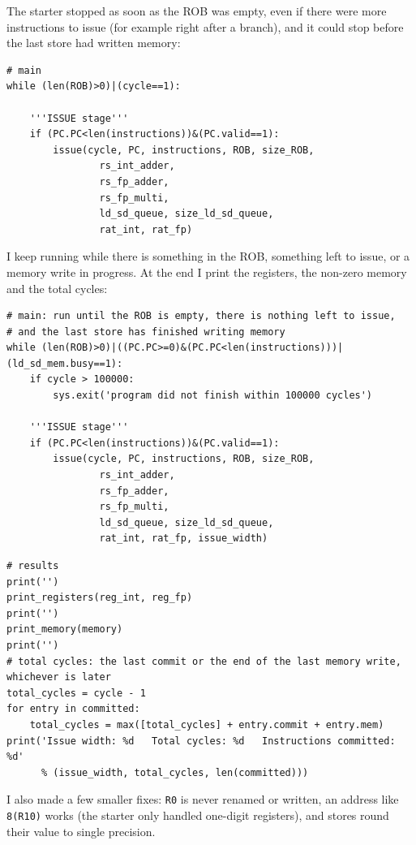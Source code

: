 \documentclass[11pt]{article}
\renewcommand{\_}{\origunderscore\allowbreak}
\begin{document}
The starter stopped as soon as the ROB was empty, even if there were more instructions to issue
(for example right after a branch), and it could stop before the last store had written memory:

\begin{lstlisting}
# main
while (len(ROB)>0)|(cycle==1):

    '''ISSUE stage'''
    if (PC.PC<len(instructions))&(PC.valid==1):
        issue(cycle, PC, instructions, ROB, size_ROB, 
                rs_int_adder, 
                rs_fp_adder, 
                rs_fp_multi, 
                ld_sd_queue, size_ld_sd_queue, 
                rat_int, rat_fp)
\end{lstlisting}

I keep running while there is something in the ROB, something left to issue, or a memory write
in progress. At the end I print the registers, the non-zero memory and the total cycles:

\begin{lstlisting}
# main: run until the ROB is empty, there is nothing left to issue,
# and the last store has finished writing memory
while (len(ROB)>0)|((PC.PC>=0)&(PC.PC<len(instructions)))|(ld_sd_mem.busy==1):
    if cycle > 100000:
        sys.exit('program did not finish within 100000 cycles')

    '''ISSUE stage'''
    if (PC.PC<len(instructions))&(PC.valid==1):
        issue(cycle, PC, instructions, ROB, size_ROB, 
                rs_int_adder, 
                rs_fp_adder, 
                rs_fp_multi, 
                ld_sd_queue, size_ld_sd_queue, 
                rat_int, rat_fp, issue_width)
\end{lstlisting}

\begin{lstlisting}
# results
print('')
print_registers(reg_int, reg_fp)
print('')
print_memory(memory)
print('')
# total cycles: the last commit or the end of the last memory write, whichever is later
total_cycles = cycle - 1
for entry in committed:
    total_cycles = max([total_cycles] + entry.commit + entry.mem)
print('Issue width: %d   Total cycles: %d   Instructions committed: %d'
      % (issue_width, total_cycles, len(committed)))
\end{lstlisting}

I also made a few smaller fixes: \texttt{R0} is never renamed or written, an address like
\texttt{8(R10)} works (the starter only handled one-digit registers), and stores round their
value to single precision.
\end{document}

